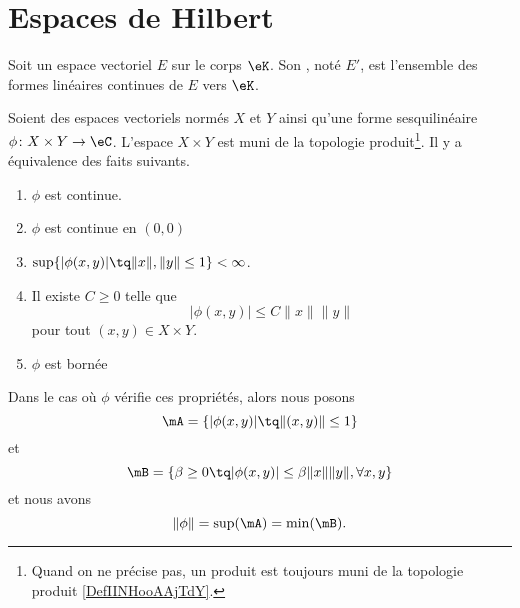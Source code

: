 
\section{Espaces de Hilbert}

\begin{definition}      \label{DEFooKSDFooGIBtrG}
	Soit un espace vectoriel \( E\) sur le corps \( \eK\). Son , noté \( E'\), est l'ensemble des formes linéaires continues de \( E\) vers \( \eK\).
\end{definition}

\begin{proposition}      \label{PROPooQFTSooPFfbCc}
    Soient des espaces vectoriels normés \( X\) et \( Y\) ainsi qu'une forme sesquilinéaire \( \phi\colon X\times Y\to \eC\). L'espace \( X\times Y\) est muni de la topologie produit\footnote{Quand on ne précise pas, un produit est toujours muni de la topologie produit \ref{DefIINHooAAjTdY}.}. Il y a équivalence des faits suivants.
	\begin{enumerate}
        \item       \label{ITEMooWMFBooOWPzgP}
		      \( \phi\) est continue.
          \item       \label{ITEMooSFQZooHNcWwH}
		      \( \phi\) est continue en \( (0,0)\)
          \item     \label{ITEMooWSWQooSYzOol}
              \( \sup\{ | \phi(x,y) |\tq \| x \|, \| y \|\leq 1 \}<\infty\).
          \item       \label{ITEMooRKHQooMVXlYD}
		      Il existe \( C\geq 0\) telle que 
              \begin{equation}
                | \phi(x,y) |\leq C\| x \|\| y \|  
              \end{equation}
                pour tout \( (x,y)\in X\times Y\).
          \item       \label{ITEMooLWDCooLIGVDs}
		      \( \phi\) est bornée
	\end{enumerate}
    Dans le cas où \( \phi\) vérifie ces propriétés, alors nous posons
    \begin{equation}
        \mA=\{ | \phi(x,y) |\tq\| (x,y) \|\leq 1 \}
    \end{equation}
    et
    \begin{equation}
        \mB=\{ \beta\geq 0\tq | \phi(x,y) |\leq \beta\| x \|\| y \|,\forall x,y \}
    \end{equation}
    et nous avons
	\begin{equation}
        \| \phi \|=\sup(\mA)=\min(\mB).
	\end{equation}
\end{proposition}


